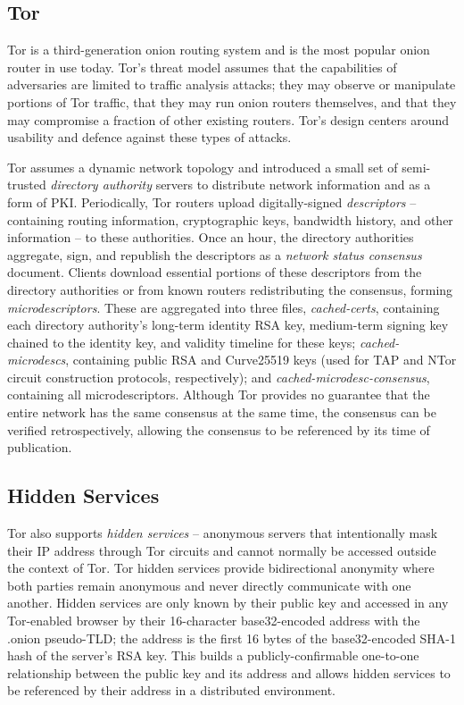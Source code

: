 \documentclass{sig-alternate}
\begin{document}
\subsection{Tor}

Tor\cite{dingledine2004tor} is a third-generation onion routing system and is the most popular onion router in use today. Tor's threat model assumes that the capabilities of adversaries are limited to traffic analysis attacks; they may observe or manipulate portions of Tor traffic, that they may run onion routers themselves, and that they may compromise a fraction of other existing routers. Tor's design centers around usability and defence against these types of attacks.

Tor assumes a dynamic network topology and introduced a small set of semi-trusted \textit{directory authority} servers to distribute network information and as a form of PKI. Periodically, Tor routers upload digitally-signed \textit{descriptors} -- containing routing information, cryptographic keys, bandwidth history, and other information -- to these authorities. Once an hour, the directory authorities aggregate, sign, and republish the descriptors as a \textit{network status consensus} document. Clients download essential portions of these descriptors from the directory authorities or from known routers redistributing the consensus, forming \textit{microdescriptors}. These are aggregated into three files, \textit{cached-certs}, containing each directory authority's long-term identity RSA key, medium-term signing key chained to the identity key, and validity timeline for these keys; \textit{cached-microdescs}, containing public RSA and Curve25519\cite{bernstein2006curve25519} keys (used for TAP\cite{goldberg2006security} and NTor\cite{goldberg2013anonymity} circuit construction protocols, respectively); and \textit{cached-microdesc-consensus}, containing all microdescriptors. Although Tor provides no guarantee that the entire network has the same consensus at the same time, the consensus can be verified retrospectively, allowing the consensus to be referenced by its time of publication.

\subsection{Hidden Services}

Tor also supports \emph{hidden services} -- anonymous servers that intentionally mask their IP address through Tor circuits and cannot normally be accessed outside the context of Tor. Tor hidden services provide bidirectional anonymity where both parties remain anonymous and never directly communicate with one another. Hidden services are only known by their public key and accessed in any Tor-enabled browser by their 16-character base32-encoded address with the .onion pseudo-TLD; the address is the first 16 bytes of the base32-encoded SHA-1 hash of the server's RSA key. This builds a publicly-confirmable one-to-one relationship between the public key and its address and allows hidden services to be referenced by their address in a distributed environment.
\end{document}
